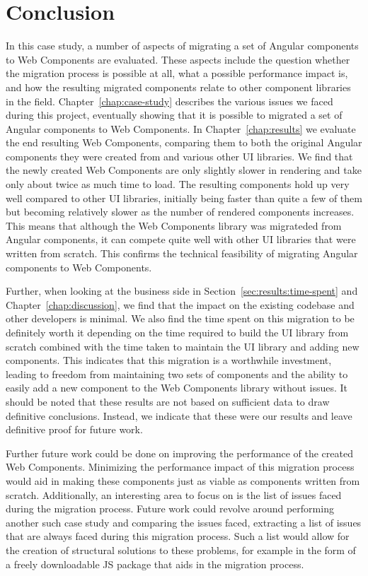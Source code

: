 \chapter{Conclusion}\label{chap:conclusion}

In this case study, a number of aspects of migrating a set of Angular components to Web Components are evaluated. These aspects include the question whether the migration process is possible at all, what a possible performance impact is, and how the resulting migrated components relate to other component libraries in the field. Chapter~\ref{chap:case-study} describes the various issues we faced during this project, eventually showing that it is possible to migrated a set of Angular components to Web Components. In Chapter~\ref{chap:results} we evaluate the end resulting Web Components, comparing them to both the original Angular components they were created from and various other UI libraries. We find that the newly created Web Components are only slightly slower in rendering and take only about twice as much time to load. The resulting components hold up very well compared to other UI libraries, initially being faster than quite a few of them but becoming relatively slower as the number of rendered components increases. This means that although the Web Components library was migrateded from Angular components, it can compete quite well with other UI libraries that were written from scratch. This confirms the technical feasibility of migrating Angular components to Web Components.

Further, when looking at the business side in Section~\ref{sec:results:time-spent} and Chapter~\ref{chap:discussion}, we find that the impact on the existing codebase and other developers is minimal. We also find the time spent on this migration to be definitely worth it depending on the time required to build the UI library from scratch combined with the time taken to maintain the UI library and adding new components. This indicates that this migration is a worthwhile investment, leading to freedom from maintaining two sets of components and the ability to easily add a new component to the Web Components library without issues. It should be noted that these results are not based on sufficient data to draw definitive conclusions. Instead, we indicate that these were our results and leave definitive proof for future work.

Further future work could be done on improving the performance of the created Web Components. Minimizing the performance impact of this migration process would aid in making these components just as viable as components written from scratch. Additionally, an interesting area to focus on is the list of issues faced during the migration process. Future work could revolve around performing another such case study and comparing the issues faced, extracting a list of issues that are always faced during this migration process. Such a list would allow for the creation of structural solutions to these problems, for example in the form of a freely downloadable JS package that aids in the migration process.

